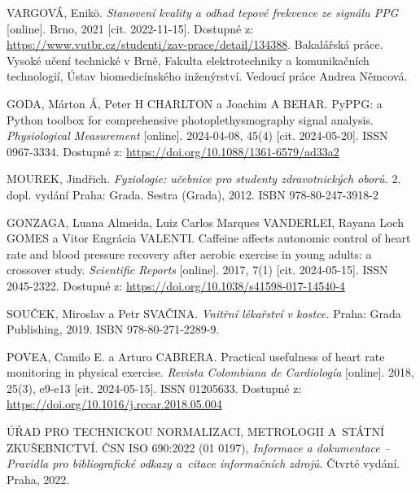 

\begin{thebibliography}{99}

	VARGOVÁ, Enikö.
	\emph{Stanovení kvality a odhad tepové frekvence ze signálu PPG} [online].
	Brno, 2021 [cit. 2022-11-15].
	Dostupné z: \url{https://www.vutbr.cz/studenti/zav-prace/detail/134388}.
	Bakalářská práce. Vysoké učení technické v Brně, Fakulta elektrotechniky a komunikačních technologií, Ústav biomedicínského inženýrství.
	Vedoucí práce Andrea Němcová.

	GODA, Márton Á, Peter H CHARLTON a Joachim A BEHAR.
	PyPPG: a Python toolbox for comprehensive photoplethysmography signal analysis.
	\emph{Physiological Measurement} [online].
	2024-04-08, 45(4) [cit. 2024-05-20].
	ISSN 0967-3334.
	Dostupné z: \url{https://doi.org/10.1088/1361-6579/ad33a2}

	MOUREK, Jindřich.
	\emph{Fyziologie: učebnice pro studenty zdravotnických oborů.}
	2.\, dopl. vydání Praha: Grada. Sestra (Grada), 2012.
	ISBN 978-80-247-3918-2

	GONZAGA, Luana Almeida, Luiz Carlos Marques VANDERLEI, Rayana Loch GOMES a Vitor Engrácia VALENTI.
	Caffeine affects autonomic control of heart rate and blood pressure recovery after aerobic exercise in young adults: a crossover study.
	\emph{Scientific Reports} [online].
	2017, 7(1) [cit. 2024-05-15].
	ISSN 2045-2322.
	Dostupné z: \url{https://doi.org/10.1038/s41598-017-14540-4}

	SOUČEK, Miroslav a Petr SVAČINA.
	\emph{Vnitřní lékařství v kostce.}
	Praha: Grada Publishing, 2019.
	ISBN 978-80-271-2289-9.

	POVEA, Camilo E. a Arturo CABRERA.
	Practical usefulness of heart rate monitoring in physical exercise.
	\emph{Revista Colombiana de Cardiología} [online].
	2018, 25(3), e9-e13 [cit. 2024-05-15].
	ISSN 01205633.
	Dostupné z: \url{https://doi.org/10.1016/j.rccar.2018.05.004}

	ÚŘAD PRO TECHNICKOU NORMALIZACI, METROLOGII A~STÁTNÍ ZKUŠEBNICTVÍ.
	ČSN ISO 690:2022 (01 0197), \emph{Informace a dokumentace -- Pravidla pro bibliografické odkazy a~citace informačních zdrojů.}
	Čtvrté vydání. Praha, 2022.


\end{thebibliography}
